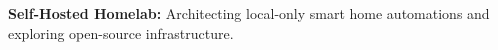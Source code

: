
\begin{cvparagraph}
\textbf{Self-Hosted Homelab:} Architecting local-only smart home automations and exploring open-source infrastructure.
\end{cvparagraph}
